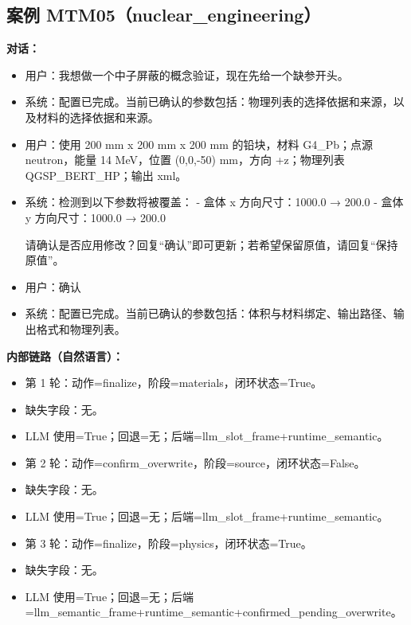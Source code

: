 \documentclass[11pt]{ctexart}
\begin{document}
\subsection{案例 MTM05（nuclear\_engineering）}
\textbf{对话：}
\begin{itemize}
\item 用户：我想做一个中子屏蔽的概念验证，现在先给一个缺参开头。
\item 系统：配置已完成。当前已确认的参数包括：物理列表的选择依据和来源，以及材料的选择依据和来源。
\item 用户：使用 200 mm x 200 mm x 200 mm 的铅块，材料 G4\_Pb；点源 neutron，能量 14 MeV，位置 (0,0,-50) mm，方向 +z；物理列表 QGSP\_BERT\_HP；输出 xml。
\item 系统：检测到以下参数将被覆盖：
- 盒体 x 方向尺寸：1000.0 → 200.0
- 盒体 y 方向尺寸：1000.0 → 200.0

请确认是否应用修改？回复“确认”即可更新；若希望保留原值，请回复“保持原值”。
\item 用户：确认
\item 系统：配置已完成。当前已确认的参数包括：体积与材料绑定、输出路径、输出格式和物理列表。
\end{itemize}
\textbf{内部链路（自然语言）：}
\begin{itemize}
\item 第 1 轮：动作=finalize，阶段=materials，闭环状态=True。
\item 缺失字段：无。
\item LLM 使用=True；回退=无；后端=llm\_slot\_frame+runtime\_semantic。
\item 第 2 轮：动作=confirm\_overwrite，阶段=source，闭环状态=False。
\item 缺失字段：无。
\item LLM 使用=True；回退=无；后端=llm\_slot\_frame+runtime\_semantic。
\item 第 3 轮：动作=finalize，阶段=physics，闭环状态=True。
\item 缺失字段：无。
\item LLM 使用=True；回退=无；后端=llm\_semantic\_frame+runtime\_semantic+confirmed\_pending\_overwrite。
\end{itemize}
\end{document}
